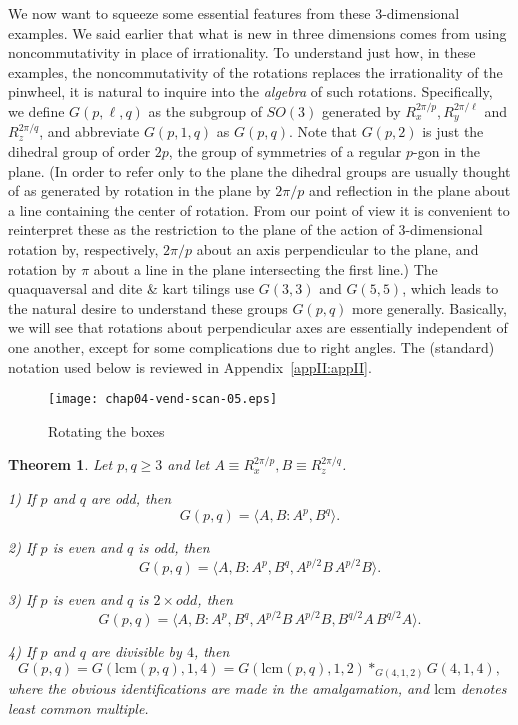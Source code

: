 \documentclass[reqno]{stml-l}
\theoremstyle{plain}
\newtheorem{theorem}{Theorem}[chapter]
\theoremstyle{definition}
\numberwithin{equation}{chapter}
\begin{document}
We now want to squeeze some essential features from these 3-dimensional examples. We said earlier that what is new in three dimensions comes from using noncommutativity in place of irrationality. To understand just how, in these examples, the noncommutativity of the rotations replaces the irrationality of the pinwheel, it is natural to inquire into the \emph{algebra} of such rotations. Specifically, we define $G(p, \ell, q)$ as the subgroup of $SO(3)$ generated by $R_{x}^{2\pi/p},R_{y}^{2\pi/\ell}$ and $R_{z}^{2\pi/q}$, and abbreviate $G(p, 1, q)$ as $G(p, q)$. Note that $G(p, 2)$ is just the dihedral group of order $2p$, the group of symmetries of a regular $p$-gon in the plane. (In order to refer only to the plane the dihedral groups are usually thought of as generated by rotation in the plane by $2\pi/p$ and reflection in the plane about a line containing the center of rotation. From our point of view it is convenient to reinterpret these as the restriction to the plane of the action of 3-dimensional rotation by, respectively, $2\pi/p$ about an axis perpendicular to the plane, and rotation by $\pi$ about a line in the plane intersecting the first line.) The quaquaversal and dite \& kart tilings use $G(3,3)$ and $G(5,5)$, which leads to the natural desire to understand these groups $G(p, q)$ more generally. Basically, we will see that rotations about perpendicular axes are essentially independent of one another, except for some complications due to right angles. The (standard) notation used below is reviewed in Appendix~\ref{appII:appII}.
\begin{figure}[h]
\texttt{[image: chap04-vend-scan-05.eps]}
\caption{Rotating the boxes}
\label{ch04:fig34}
\end{figure}

\begin{theorem}\label{ch04:thm4.7}
Let $p,q\geq 3$ and let $A\equiv R_{x}^{2\pi/p},B\equiv R_{z}^{2\pi/q}$.

1) If $p$ and $q$ are odd, then
\begin{equation*}
G(p, q)=\langle A,B:A^{p}, B^{q}\rangle.
\end{equation*}

2) If $p$ is even and $q$ is odd, then
\begin{equation*}
G(p, q)=\langle A,B:A^{p},B^{q}, A^{p/2}B\,A^{p/2}B\rangle.
\end{equation*}

3) If $p$ is even and $q$ is $2\times odd$, then
\begin{equation*}
G(p, q)=\langle A,B:A^{p},B^{q},A^{p/2}B\,A^{p/2}B, B^{q/2}A\,B^{q/2}A\rangle.
\end{equation*}

4) If $p$ and $q$ are divisible by $4$, then
\begin{equation*}
G(p, q)=G(\mathrm{lcm}(p, q), 1,4)=G(\mathrm{lcm}(p, q), 1,2)\ast_{G(4,1,2)}G(4,1,4),
\end{equation*}
where the obvious identifications are made in the amalgamation, and $\mathrm{lcm}$
denotes least common multiple.
\end{theorem}
\end{document}
